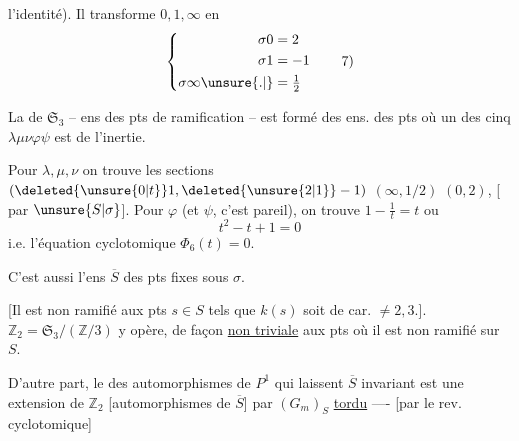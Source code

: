 l'identité). Il transforme $0,1,\infty$ en
\begingroup\makeatletter\tagsleft@true\makeatother
\[
\left\{\begin{aligned}
\sigma0&=2\\
\sigma1&=-1\\
\sigma\infty\unsure{.|}&=\tfrac12
\end{aligned}\right.\tag*{7)}
\]
\endgroup

La  de $\mathfrak{S}_3$ -- ens des pts de ramification -- est formé des ens. des pts où un des cinq  $\lambda\mu\nu\varphi\psi$ est de l'inertie.

Pour $\lambda,\mu,\nu$ on trouve les sections $(\deleted{\unsure{0|t}}1,\deleted{\unsure{2|1}}-1)$ $(\infty,1/2)$ $(0,2)$, [ par $\unsure{S|\sigma}$]. Pour $\varphi$ (et $\psi$, c'est pareil), on trouve $1-\frac1t=t$ ou
\begingroup\makeatletter\tagsleft@true\makeatother
\[
t^2-t+1=0\tag*{8)}
\]
\endgroup
i.e. l'équation cyclotomique $\boxed{\Phi_6(t)=0}$. 

 C'est aussi l'ens $\overline{S}$ des pts fixes sous $\sigma$.

[Il est non ramifié  aux pts $s\in S$ tels que $k(s)$ soit de car. $\ne2,3$.]. $\mathbb{Z}_2=\mathfrak{S}_3/(\mathbb{Z}/3)$ y\unsure{:|} opère, de façon \uline{non triviale} aux pts où il est non ramifié sur $S$.

D'autre part, le   des automorphismes de $P^1$ qui laissent $\overline{S}$  invariant est une extension de $\mathbb{Z}_2$ [automorphismes de $\overline{S}$] par $(G_m)_S$ \uline{tordu} ---- [par le rev. cyclotomique]

